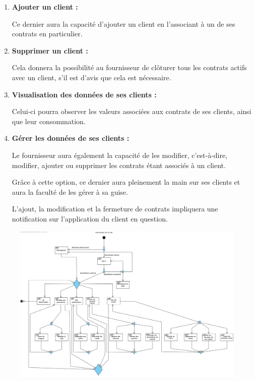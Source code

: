 \begin{enumerate}[-]

\item \textbf{Ajouter un client : }\newline

Ce dernier aura la capacité d’ajouter un client en l’associant à un de ses contrats en particulier.

\item \textbf{Supprimer un client :}\newline

Cela donnera la possibilité au fournisseur de clôturer tous les contrats actifs avec un client, s’il est d’avis que cela est nécessaire.

\item \textbf{Visualisation des données de ses clients :}\newline

Celui-ci pourra observer les valeurs associées aux contrats de ses clients, ainsi que leur consommation.

\item \textbf{Gérer les données de ses clients : }\newline

Le fournisseur aura également la capacité de les modifier, c’est-à-dire, modifier, ajouter ou supprimer les contrats étant associés à un client.\newline

Grâce à cette option, ce dernier aura pleinement la main sur ses clients et aura la faculté de les gérer à sa guise.\newline

L’ajout, la modification et la fermeture de contrats impliquera une notification sur l’application du client en question.

\end{enumerate}

\newpage

\begin{figure}[h]
\centering
\includegraphics[width = 1\textwidth]{Base/overview/img/overview-fournisseur.png}
\end{figure}
